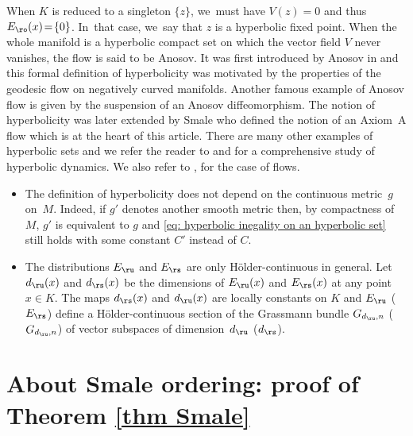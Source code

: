 \begin{appendix}
When $K$ is reduced to a singleton $\{z\}$, we~must have $V(z) \!=\! 0$ and thus \hbox{$E_\ro (x) \!=\! \{0\}$}. In~that case, we~say that $z$ is a hyperbolic fixed point. When the whole manifold is a hyperbolic compact set on which the vector field $V$ never vanishes, the flow is said to be Anosov. It was first introduced by Anosov in \cite{anosov} and this formal definition of hyperbolicity was motivated by the properties of the geodesic flow on negatively curved manifolds. Another famous example of Anosov flow is given by the suspension of an Anosov diffeomorphism. The notion of hyperbolicity was later extended by Smale who defined the notion of an Axiom~A flow which is at the heart of this article. There are many other examples of hyperbolic sets and we refer the reader to \cite{katok-hasselblatt} and \cite{palis-demelo} for a comprehensive study of hyperbolic dynamics. We also refer to \cite{dyatlov}, \cite{FH} for the case of flows.

\skpt
\begin{remark}
\begin{itemize}
\item The definition of hyperbolicity does not depend on the continuous metric~$g$ on~$M$. Indeed, if $g'$ denotes another smooth metric then, by compactness of $M$, $g'$ is equivalent to $g$ and \eqref{eq: hyperbolic inegality on an hyperbolic set} still holds with some constant $C'$ instead of $C$.
\item The distributions $E_\ru$ and $E_\rs$ are only Hölder-continuous in general. Let $d_\ru (x)$ and $d_\rs (x)$ be the dimensions of $E_\ru (x)$ and $E_\rs (x)$ at any point $x \in K$. The maps $d_\rs (x)$ and $d_\ru (x)$ are locally constants on $K$ and $E_\ru$ (\resp $E_\rs$) define a Hölder-continuous section of the Grassmann bundle $G_{d_\ru, n}$ (\resp $G_{d_\ru, n}$) of vector subspaces of dimension~$d_\ru$ (\resp $d_\rs$).
\end{itemize}
\end{remark}

\section{About Smale ordering: proof of Theorem \ref{thm Smale}}


\end{appendix}
